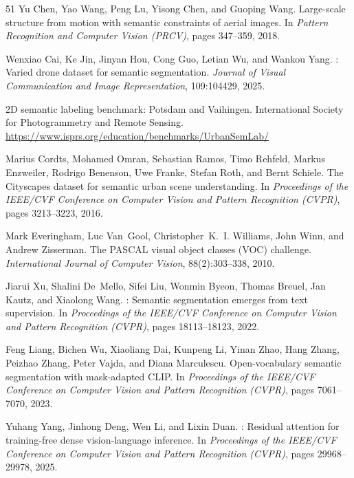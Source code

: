 \begin{thebibliography}{51}
Yu Chen, Yao Wang, Peng Lu, Yisong Chen, and Guoping Wang.
\newblock Large-scale structure from motion with semantic constraints of aerial
  images.
\newblock In \emph{Pattern Recognition and Computer Vision (PRCV)}, pages
  347--359, 2018.
\newblock {}

Wenxiao Cai, Ke Jin, Jinyan Hou, Cong Guo, Letian Wu, and Wankou Yang.
: Varied drone dataset for semantic segmentation.
\newblock \emph{Journal of Visual Communication and Image Representation},
  109:104429, 2025.
\newblock {}

 2D semantic labeling benchmark: Potsdam and Vaihingen.
\newblock International Society for Photogrammetry and Remote Sensing.
\newblock \url{https://www.isprs.org/education/benchmarks/UrbanSemLab/}

Marius Cordts, Mohamed Omran, Sebastian Ramos, Timo Rehfeld, Markus
  Enzweiler, Rodrigo Benenson, Uwe Franke, Stefan Roth, and Bernt Schiele.
\newblock The {Cityscapes} dataset for semantic urban scene understanding.
\newblock In \emph{Proceedings of the IEEE/CVF Conference on Computer Vision
  and Pattern Recognition (CVPR)}, pages 3213--3223, 2016.
\newblock {}

Mark Everingham, Luc Van~Gool, Christopher~K.~I. Williams, John Winn, and
  Andrew Zisserman.
\newblock The {PASCAL} visual object classes ({VOC}) challenge.
\newblock \emph{International Journal of Computer Vision}, 88(2):303--338,
  2010.
\newblock {}

Jiarui Xu, Shalini De~Mello, Sifei Liu, Wonmin Byeon, Thomas Breuel, Jan
  Kautz, and Xiaolong Wang.
: Semantic segmentation emerges from text supervision.
\newblock In \emph{Proceedings of the IEEE/CVF Conference on Computer Vision
  and Pattern Recognition (CVPR)}, pages 18113--18123, 2022.
\newblock {}

Feng Liang, Bichen Wu, Xiaoliang Dai, Kunpeng Li, Yinan Zhao, Hang Zhang,
  Peizhao Zhang, Peter Vajda, and Diana Marculescu.
\newblock Open-vocabulary semantic segmentation with mask-adapted {CLIP}.
\newblock In \emph{Proceedings of the IEEE/CVF Conference on Computer Vision
  and Pattern Recognition (CVPR)}, pages 7061--7070, 2023.
\newblock {}

Yuhang Yang, Jinhong Deng, Wen Li, and Lixin Duan.
: Residual attention for training-free dense
  vision-language inference.
\newblock In \emph{Proceedings of the IEEE/CVF Conference on Computer Vision
  and Pattern Recognition (CVPR)}, pages 29968--29978, 2025.
\newblock {}


\end{thebibliography}
